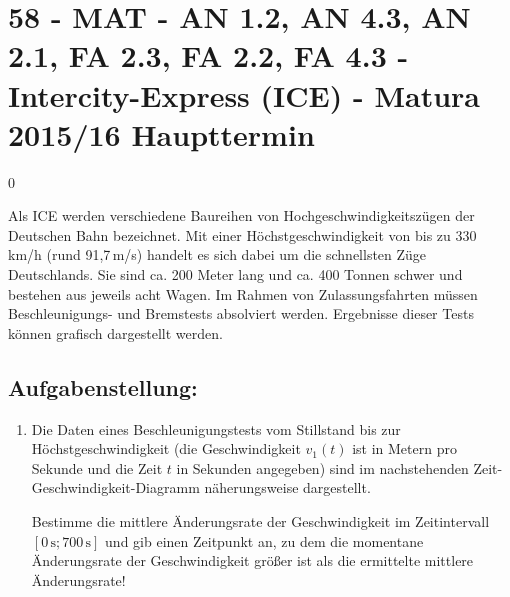 \section{58 - MAT - AN 1.2, AN 4.3, AN 2.1, FA 2.3, FA 2.2, FA 4.3 - Intercity-Express (ICE) - Matura 2015/16 Haupttermin}

\begin{langesbeispiel} \item[0] %
	
Als ICE werden verschiedene Baureihen von Hochgeschwindigkeitszügen der Deutschen Bahn bezeichnet. Mit einer Höchstgeschwindigkeit von bis zu 330\,km/h (rund 91,7\,m/s) handelt es sich dabei um die schnellsten Züge Deutschlands. Sie sind ca. 200 Meter lang und ca. 400 Tonnen  schwer und bestehen aus jeweils acht Wagen. Im Rahmen von Zulassungsfahrten müssen Beschleunigungs- und Bremstests absolviert werden. Ergebnisse dieser Tests können grafisch dargestellt werden. 

\subsection{Aufgabenstellung:}
\begin{enumerate}
	\item Die Daten eines Beschleunigungstests vom Stillstand bis zur Höchstgeschwindigkeit (die Geschwindigkeit $v_1(t)$ ist in Metern pro Sekunde und die Zeit $t$ in Sekunden angegeben) sind im nachstehenden Zeit-Geschwindigkeit-Diagramm näherungsweise dargestellt.
	
	\begin{center}
\end{center}

Bestimme die mittlere Änderungsrate der Geschwindigkeit im Zeitintervall $[0\,\text{s};700\,\text{s}]$ und gib einen Zeitpunkt an, zu dem die momentane Änderungsrate der Geschwindigkeit größer ist als die ermittelte mittlere Änderungsrate!\leer


\end{enumerate}
\end{langesbeispiel}
